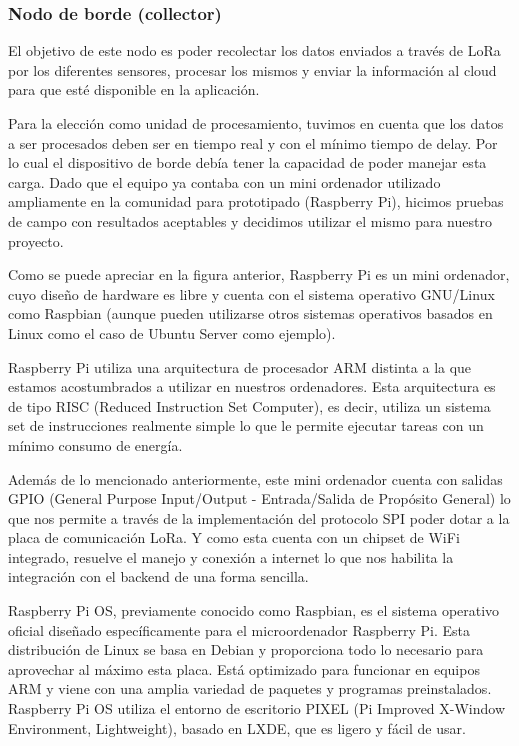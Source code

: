 \clearpage

\subsubsection{Nodo de borde (collector)}
El objetivo de este nodo es poder recolectar los datos enviados a través de LoRa por los diferentes sensores, procesar los mismos y enviar la información al cloud para que esté disponible en la aplicación.

Para la elección como unidad de procesamiento, tuvimos en cuenta que los datos a ser procesados deben ser en tiempo real y con el mínimo tiempo de delay. Por lo cual el dispositivo de borde debía tener la capacidad de poder manejar esta carga. Dado que el equipo ya contaba con un mini ordenador utilizado ampliamente en la comunidad para prototipado (Raspberry Pi), hicimos pruebas de campo con resultados aceptables y decidimos utilizar el mismo para nuestro proyecto.


Como se puede apreciar en la figura anterior, Raspberry Pi es un mini ordenador, cuyo diseño de hardware es libre y cuenta con el sistema operativo GNU/Linux como Raspbian (aunque pueden utilizarse otros sistemas operativos basados en Linux como el caso de Ubuntu Server como ejemplo). 


Raspberry Pi utiliza una arquitectura de procesador ARM distinta a la que estamos acostumbrados a utilizar en nuestros ordenadores. Esta arquitectura es de tipo RISC (Reduced Instruction Set Computer), es decir, utiliza un sistema set de instrucciones realmente simple lo que le permite ejecutar tareas con un mínimo consumo de energía.

Además de lo mencionado anteriormente, este mini ordenador cuenta con salidas GPIO (General Purpose Input/Output - Entrada/Salida de Propósito General) lo que nos permite a través de la implementación del protocolo SPI poder dotar a la placa de comunicación LoRa. Y como esta cuenta con un chipset de WiFi integrado, resuelve el manejo y conexión a internet lo que nos habilita la integración con el backend de una forma sencilla.


Raspberry Pi OS, previamente conocido como Raspbian, es el sistema operativo oficial diseñado específicamente para el microordenador Raspberry Pi. Esta distribución de Linux se basa en Debian y proporciona todo lo necesario para aprovechar al máximo esta placa. Está optimizado para funcionar en equipos ARM y viene con una amplia variedad de paquetes y programas preinstalados. Raspberry Pi OS utiliza el entorno de escritorio PIXEL (Pi Improved X-Window Environment, Lightweight), basado en LXDE, que es ligero y fácil de usar.

